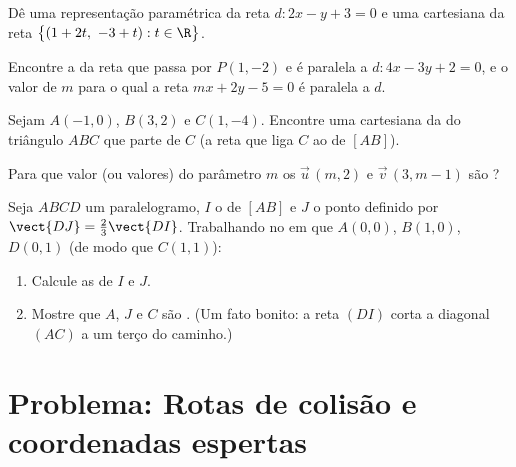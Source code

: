 \begin{exercise}[$\star\star$]\label{exo:g11:vect:7}
Dê uma representação paramétrica da reta $d: 2x - y + 3 = 0$ e uma
 cartesiana da reta
$\bigl\{(1 + 2t,\ -3 + t) : t \in \R\bigr\}$.
\end{exercise}

\begin{exercise}[$\star\star$]\label{exo:g11:vect:8}
Encontre a  da reta que passa por $P(1, -2)$ e é paralela a
$d: 4x - 3y + 2 = 0$, e o valor de $m$ para o qual a reta
$mx + 2y - 5 = 0$ é paralela a $d$.
\end{exercise}

\begin{exercise}[$\star\star$]\label{exo:g11:vect:9}
Sejam $A(-1, 0)$, $B(3, 2)$ e $C(1, -4)$. Encontre uma  cartesiana
da \emph{} do triângulo $ABC$ que parte de $C$ (a reta que liga
$C$ ao  de $[AB]$).
\end{exercise}

\begin{exercise}[$\star\star$]\label{exo:g11:vect:10}
Para que valor (ou valores) do parâmetro $m$ os  $\vec u\,(m, 2)$
e $\vec v\,(3, m - 1)$ são ?
\end{exercise}

\begin{exercise}[$\star\star\star$]\label{exo:g11:vect:11}
Seja $ABCD$ um paralelogramo, $I$ o  de $[AB]$ e $J$ o ponto
definido por $\vect{DJ} = \frac23 \vect{DI}$. Trabalhando no  em que $A(0,0)$, $B(1,0)$, $D(0,1)$ (de modo que $C(1,1)$):
\begin{enumerate}
  \item Calcule as  de $I$ e $J$.
  \item Mostre que $A$, $J$ e $C$ são . (Um fato bonito: a reta
        $(DI)$ corta a diagonal $(AC)$ a um terço do caminho.)
\end{enumerate}
\end{exercise}

\section{Problema: Rotas de colisão e coordenadas espertas}

